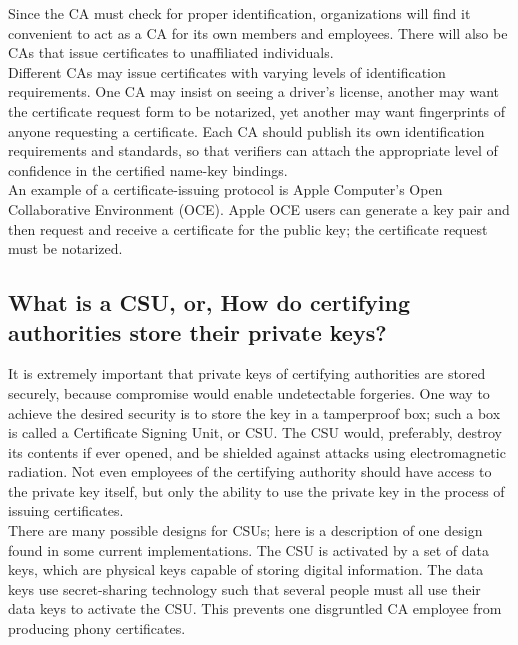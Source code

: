 Since the CA must check for proper identification, organizations will
find it convenient to act as a CA for its own members and employees.
There will also be CAs that issue certificates to unaffiliated
individuals.\\

Different CAs may issue certificates with varying levels of
identification requirements. One CA may insist on seeing a driver's
license, another may want the certificate request form to be notarized,
yet another may want fingerprints of anyone requesting a certificate.
Each CA should publish its own identification requirements and
standards, so that verifiers can attach the appropriate level of
confidence in the certified name-key bindings.\\

An example of a certificate-issuing protocol is Apple Computer's Open
Collaborative Environment (OCE). Apple OCE users can generate a key
pair and then request and receive a certificate for the public key; the
certificate request must be notarized.

\subsection{What is a CSU, or, How do certifying authorities store their
private keys?}
\label{what_csu}

It is extremely important that private keys of certifying authorities
are stored securely, because compromise would enable undetectable
forgeries. One way to achieve the desired security is to store the key
in a tamperproof box; such a box is called a Certificate Signing Unit,
or CSU. The CSU would, preferably, destroy its contents if ever opened,
and be shielded against attacks using electromagnetic radiation. Not
even employees of the certifying authority should have access to the
private key itself, but only the ability to use the private key in the
process of issuing certificates.\\

There are many possible designs for CSUs; here is a description of one
design found in some current implementations. The CSU is activated by a
set of data keys, which are physical keys capable of storing digital
information. The data keys use secret-sharing technology such that
several people must all use their data keys to activate the CSU. This
prevents one disgruntled CA employee from producing phony certificates.\\

